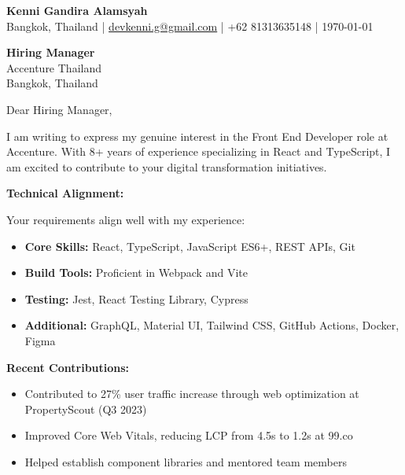 \documentclass[11pt]{article}
\begin{document}
\begin{flushleft}
\textbf{\Large Kenni Gandira Alamsyah}\\
Bangkok, Thailand | \href{mailto:devkenni.g@gmail.com}{devkenni.g@gmail.com} | +62 81313635148 | \today
\end{flushleft}

\vspace{0.5cm}

\begin{flushleft}
\textbf{Hiring Manager}\\
Accenture Thailand\\
Bangkok, Thailand
\end{flushleft}

\vspace{0.5cm}

Dear Hiring Manager,

\vspace{0.3cm}

I am writing to express my genuine interest in the Front End Developer role at Accenture. With 8+ years of experience specializing in React and TypeScript, I am excited to contribute to your digital transformation initiatives.

\vspace{0.3cm}

\textbf{Technical Alignment:}

Your requirements align well with my experience:
\begin{itemize}
    \setlength\itemsep{0.1em}
    \item \textbf{Core Skills:} React, TypeScript, JavaScript ES6+, REST APIs, Git
    \item \textbf{Build Tools:} Proficient in Webpack and Vite
    \item \textbf{Testing:} Jest, React Testing Library, Cypress
    \item \textbf{Additional:} GraphQL, Material UI, Tailwind CSS, GitHub Actions, Docker, Figma
\end{itemize}

\vspace{0.3cm}

\textbf{Recent Contributions:}
\begin{itemize}
    \setlength\itemsep{0.1em}
    \item Contributed to 27\% user traffic increase through web optimization at PropertyScout (Q3 2023)
    \item Improved Core Web Vitals, reducing LCP from 4.5s to 1.2s at 99.co
    \item Helped establish component libraries and mentored team members
\end{itemize}
\end{document}
